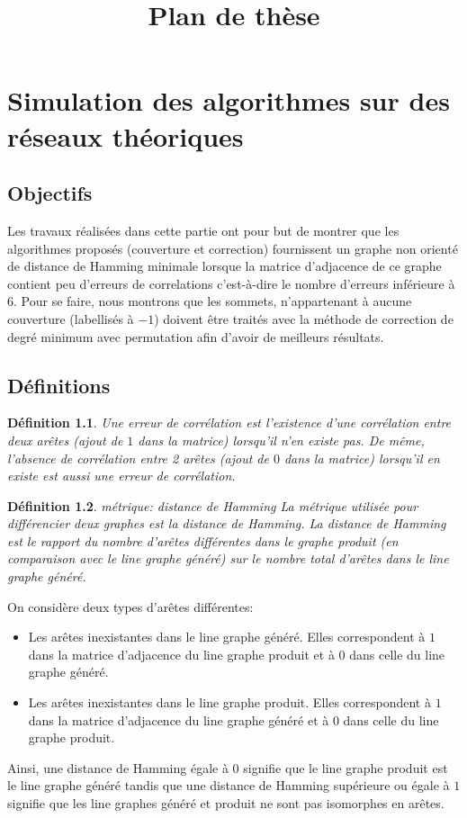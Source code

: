 \documentclass[onecolumn, 12pt]{book}
\title{Plan de th\`ese}
\date{\oldstylenums{1875}}
\newtheorem{definition}{D\'efinition}
\begin{document}
\maketitle
\tableofcontents

\chapter{Simulation des algorithmes sur des r\'eseaux th\'eoriques}

\section{Objectifs}
Les travaux r\'ealis\'ees dans cette partie ont pour but de montrer que les algorithmes propos\'es (couverture et correction) fournissent un graphe non orient\'e de distance de Hamming minimale lorsque la matrice d'adjacence de ce graphe contient peu d'erreurs de correlations c'est-\`a-dire le nombre d'erreurs inf\'erieure \`a $6$. 
Pour se faire, nous montrons que les sommets, n'appartenant \`a aucune couverture (labellis\'es \`a $-1$) doivent \^etre trait\'es avec la m\'ethode de correction de degr\'e minimum avec permutation afin d'avoir de meilleurs r\'esultats.

\section{D\'efinitions}
\begin{definition}
Une {\em erreur de corr\'elation} est l'existence d'une corr\'elation entre deux ar\^etes (ajout de $1$ dans la matrice) lorsqu'il n'en existe pas. De m\^eme, l'absence de corr\'elation entre 2 ar\^etes (ajout de $0$ dans la matrice) lorsqu'il en existe  est aussi une erreur de corr\'elation.
\end{definition}

\begin{definition}{ m\'etrique: distance de Hamming} \newline
La m\'etrique utilis\'ee pour diff\'erencier deux graphes est la {\em distance de Hamming}.
La distance de Hamming est le rapport du nombre d'ar\^etes diff\'erentes dans le graphe produit (en comparaison avec le line graphe g\'en\'er\'e) sur le nombre total d'ar\^etes dans le line graphe g\'en\'er\'e.
\end{definition}
On consid\`ere deux types d'ar\^etes diff\'erentes:
\begin{itemize}
	\item Les ar\^etes inexistantes dans le line graphe g\'en\'er\'e. Elles correspondent \`a $1$ dans la matrice d'adjacence du line graphe produit et \`a $0$ dans celle du line graphe g\'en\'er\'e. 
	\item Les ar\^etes inexistantes dans le line graphe produit. Elles correspondent \`a $1$ dans la matrice d'adjacence du line graphe g\'en\'er\'e et \`a $0$ dans celle du line graphe produit. 
\end{itemize} 
Ainsi, une distance de Hamming \'egale \`a $0$ signifie que le line graphe produit est le line graphe g\'en\'er\'e tandis que  une distance de Hamming sup\'erieure ou \'egale \`a $1$ signifie que les line graphes g\'en\'er\'e et produit ne sont pas isomorphes en ar\^etes. 
\end{document}
